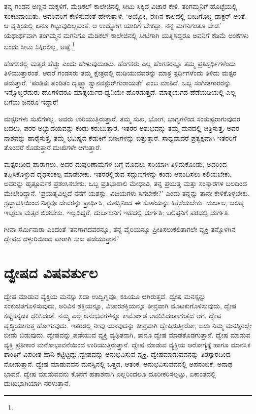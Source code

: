 ತನ್ನ ಗಂಡನ ಅಣ್ಣನ ಮಕ್ಕಳಿಗೆ, ಮೆಡಿಕಲ್ ಕಾಲೇಜಿನಲ್ಲಿ ಸೀಟು ಸಿಕ್ಕಿದ ವಿಚಾರ ಕೇಳಿ, ತಂಗಮ್ಮನಿಗೆ ಹೊಟ್ಟೆಯಲ್ಲಿ ಸಂಕಟವಾಯಿತು. ಅವರಿವರಿಗೆ ಕೇಳಿಸುವಂತೆ ಹೇಳುತ್ತಾಳೆ: ‘ಅಯ್ಯೋ, ಈಗಿನ ಕಾಲದಲ್ಲಿ ಬೀದಿಗೊಬ್ಬ ಡಾಕ್ಟರ್ ಅಂತೆ. ಆ ವೃತ್ತಿಯಲ್ಲಿ ಏನೂ ಗಿಟ್ಟುವುದಿಲ್ಲವಂತೆ. ಆ ಉದ್ಯೋಗ ಯಾರಿಗೆ ಬೇಕಪ್ಪಾ. ನನ್ನ ಮಗನಿಗಂತೂ ಬೇಡ.’ ಯಥಾರ್ಥವಾಗಿ ತಂಗಮ್ಮನ ಮಗನಿಗೂ ಮೆಡಿಕಲ್ ಕಾಲೇಜಿನಲ್ಲಿ ಸೀಟಿಗಾಗಿ ಯತ್ನಿಸಿದ್ದರೂ ಅವನಿಗೆ ಕಡಿಮೆ ಅಂಕಗಳು ಬಂದು ಸೀಟು ಸಿಕ್ಕಿರಲಿಲ್ಲ, ಅಷ್ಟೆ.\footnote{}

ಹೆಂಗಸರಲ್ಲಿ ಮತ್ಸರ ಹೆಚ್ಚು ಎಂದು ಹೇಳುವುದುಂಟು. ಹೆಂಗಸರು ಎಲ್ಲ ಹೆಂಗಸರನ್ನೂ ತಮ್ಮ ಪ್ರತಿಸ್ಪರ್ಧಿಗಳೆಂದು ತಿಳಿಯುತ್ತಾರಂತೆ. ಆದರೆ ಗಂಡಸರು ತಮ್ಮ ಕ್ಷೇತ್ರದಲ್ಲಿ ದುಡಿಯುವವರನ್ನು ಮಾತ್ರ ಸ್ಪರ್ಧಿಗಳೆಂದು ತಿಳಿದು ಮತ್ಸರ ಪಡುತ್ತಾರೆ. ‘ಪಂಡಿತಃ ಪಂಡಿತಂ ದೃಷ್ಟ್ವಾ ಶ್ವಾನವತ್\break ಗುರ್​ಗುರಾಯತೇ’ ಎಂಬ ಮಾತಿದೆ. ಒಬ್ಬ ಸಂಗೀತಗಾರರನ್ನು ಇನ್ನೊಬ್ಬರೆದುರು ಹೊಗಳಿದರೂ ಮಾತ್ಸರ್ಯದ ಧ್ವನಿಯೇ ಹೊರಡುತ್ತದೆ. ಮಾತ್ಸರ್ಯದ ಹೆಡೆಯಡಿಯಲ್ಲಿ ಎಲ್ಲ ಬಗೆಯ ಜನರೂ ಇದ್ದಾರೆ!

\newpage

ಮತ್ಸರಿಗಳು ಸುಖಿಗಳಲ್ಲ. ಅವರು ಉರಿಯುತ್ತಿರುತ್ತಾರೆ. ತಮ್ಮ ಸುಖ, ಭೋಗ, ಭಾಗ್ಯಗಳಿಂದ ಸಂತುಷ್ಟರಾಗುವುದರ ಬದಲು, ಪರರ ಅಭ್ಯುದಯವನ್ನು ಕಂಡು ಕರುಬುತ್ತಾರೆ. ಇತರರ ಅಶುಭವನ್ನು ತಮ್ಮ ಮನದಲ್ಲಿ ಚಿತ್ರಿಸುತ್ತ, ಅವರ ನಾಶವನ್ನು ಹಾರೈಸುತ್ತ, ತಮ್ಮ ಭವಿಷ್ಯದ ಕೆಡುಕಿಗೆ ಬೀಜಗಳನ್ನು ಬಿತ್ತುತ್ತಾರೆ. ಸಾಧ್ಯವಾದರೆ ಪ್ರತ್ಯಕ್ಷವಾಗಿ ಇತರರಿಗೆ ತೊಂದರೆ ಕೊಡುತ್ತಾರೆ.\break ದುಃಖಿಗಳೇ ಆಗುತ್ತಾರೆ.

ಮತ್ಸರದಿಂದ ಪಾರಾಗಲು, ಅದರ ದುಷ್ಪರಿಣಾಮಗಳ ಬಗ್ಗೆ ಮೊದಲು ಸರಿಯಾಗಿ ತಿಳಿದುಕೊಂಡು, ಅದರಿಂದ ತಪ್ಪಿಸಿಕೊಳ್ಳುವ ದೃಢಸಂಕಲ್ಪ ಮಾಡಬೇಕು. ಇತರರಲ್ಲಿರುವ ಸದ್ಗುಣಗಳನ್ನು ಕಂಡು ಆನಂದಿಸಲು ಕಲಿಯಬೇಕು. ಅವರನ್ನು ಹೃತ್ಪೂರ್ವಕ ಪ್ರಶಂಸಿಸಬೇಕು. ಒಬ್ಬ ಪ್ರತಿಭಾಶಾಲಿ ಮೇಧಾವಿ, ತನ್ನ ಪ್ರಯತ್ನ ಮತ್ತು ಸಂಸ್ಕಾರಗಳ ಬಲದಿಂದ ಮೇಲೇರಿದ್ದಾನೆ. ‘ಪ್ರಯತ್ನವಿಲ್ಲದೆ ನನಗೆ ಯಶಸ್ಸು, ವಿಜಯಗಳು ಸಿಗಬೇಕೇ?’ ಎಂದು ತನ್ನನ್ನು ತಾನೇ ಕೇಳಿಕೊಳ್ಳಬೇಕು. ಶ್ರದ್ಧಾಭಕ್ತಿಯಿಂದ ನಿತ್ಯವೂ ದೇವರನ್ನು ಪ್ರಾರ್ಥಿಸಿ, ಮನಸ್ಸಿನಿಂದ ಈ ಕೊಳೆಯನ್ನು ಕಿತ್ತೆಸೆಯಬೇಕು. ದುರ್ಬಲ, ಬಲಿಷ್ಠ ಇಬ್ಬರೂ ಮತ್ಸರ ಬಿಡಬೇಕು. ಇಲ್ಲದಿದ್ದರೆ, ದುರ್ಬಲನಿಗೆ ಇಹದಲ್ಲಿ ದುರ್ಗತಿ; ಬಲಿಷ್ಠನಿಗೆ ಪರದಲ್ಲಿ ದುರ್ಗತಿ.

ಗೀನಾ ಸೆರ್ಮಿನಾರಾ ಎಂದಂತೆ ‘ತನಗಾಗದವರನ್ನೂ, ತನ್ನ ವೈರಿಯನ್ನೂ ಪ್ರೀತಿಸಲು\break ಕಲಿತಾಗಲೇ ವ್ಯಕ್ತಿ ತನ್ನೊಳಗಿನ ದ್ವೇಷದ ದಳ್ಳುರಿಯಿಂದ ಪಾರಾಗಿ ಸುಖ ಪಡೆಯುತ್ತಾನೆ.’


\section*{ದ್ವೇಷದ ವಿಷವರ್ತುಲ}


ದ್ವೇಷ ಮಾಡುವ ವ್ಯಕ್ತಿಯ ಮನಸ್ಸು ಸದಾ ಉದ್ವಿಗ್ನವೂ, ಕಹಿಯೂ ಆಗಿರುತ್ತದೆ. ದ್ವೇಷ ಮನಸ್ಸನ್ನು ಸಂಕುಚಿತಗೊಳಿಸುವುದು, ಅರಿವಿನ ಶಕ್ತಿಯನ್ನೂ, ವಿಚಾರಶಕ್ತಿಯನ್ನೂ ತೀವ್ರವಾಗಿ ಮೊಟಕುಗೊಳಿಸುವುದು, ದ್ವೇಷ ಕಪ್ಪುಕನ್ನಡಕ ಧರಿಸಿದಂತೆ. ನಮ್ಮ ಎಲ್ಲ ಅನುಭವಗಳನ್ನೂ ಕಾರ್ಮೋಡ ಆವರಿಸಿದಂತಾಗುತ್ತದೆ ಆಗ. ದ್ವೇಷ ವೃದ್ಧಿಯಾಗುತ್ತ ಹೋಗುವುದು. ಇತರರಲ್ಲಿ ನೀವು ಯಾವುದನ್ನು ತೀವ್ರವಾಗಿ ದ್ವೇಷಿಸುತ್ತೀರೋ, ಅದು ನಿಮ್ಮ ಮನಸ್ಸಿನಲ್ಲೇ ಬೀಡು ಬಿಡುವುದು. ದ್ವೇಷವನ್ನು ಪಡೆಯುವ ವ್ಯಕ್ತಿ ವ್ಯಥಿತನಾಗಿ, ತಾನೂ ದ್ವೇಷ ಮಾಡತೊಡಗುತ್ತಾನೆ. ದ್ವೇಷ ಮಾಡುವ ವ್ಯಕ್ತಿ ಪ್ರತೀಕಾರ ಮನೋಭಾವನೆಯಿಂದ ಉರಿಯುತ್ತಿರುತ್ತಾನೆ. ದ್ವೇಷ ಮಾಡುವ ವ್ಯಕ್ತಿಯ ಆರೋಗ್ಯಕ್ಕೆ ಹಾಗೂ ಮಾನಸಿಕ ಶಾಂತಿಗೆ ವಿಪರೀತ ಹಾನಿ ಕಟ್ಟಿಟ್ಟದ್ದು.\break ದ್ವೇಷವನ್ನು ಅನುಭವಿಸುವ ವ್ಯಕ್ತಿ, ದ್ವೇಷಮಾಡುವವನನ್ನು ತಿರಸ್ಕಾರದಿಂದ ನೋಡುತ್ತಾನೆ. ದ್ವೇಷ ಮಾಡುವವನ ಮನಸ್ಸಿನಲ್ಲಿ ಒತ್ತಡ, ಆತಂಕ; ಅನುಭವಿಸುವವನಲ್ಲಿ ಅಪನಂಬಿಕೆ, ಅನಾಥ ಭಾವನೆ. ದ್ವೇಷ ಮಾಡುವವನು ಕೊನೆಗೆ ಹತಾಶನಾಗಿ ಎಲ್ಲರಿಂದಲೂ ದೂರೀಕರಿಸಲ್ಪಟ್ಟು, ಏಕಾಂತದಲ್ಲಿ ದುಃಖಭಾಗಿಯಾಗಿ ನರಳುತ್ತಾನೆ.

